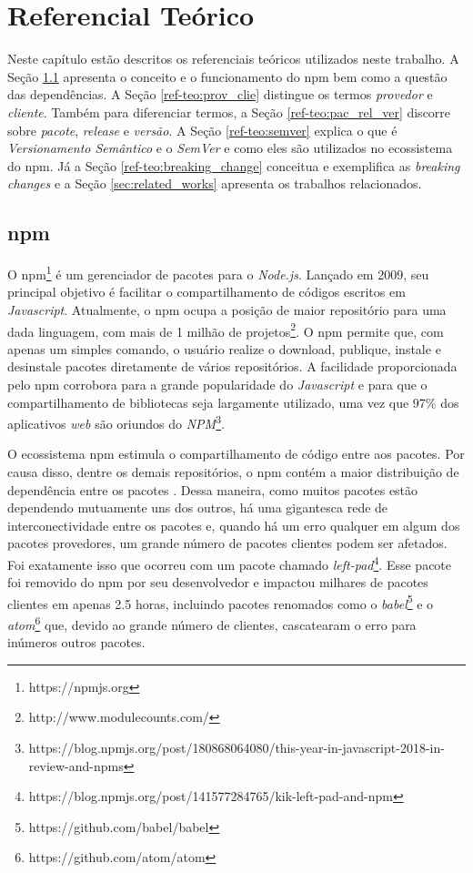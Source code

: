 \chapter{Referencial Teórico}
\label{cap:ref-teorico}
Neste capítulo estão descritos os referenciais teóricos utilizados neste trabalho. A Seção \ref{ref-teo:npm} apresenta o conceito e o funcionamento do \gls{npm} bem como a questão das dependências. A Seção \ref{ref-teo:prov_clie} distingue os termos \textit{provedor} e \textit{cliente}. Também para diferenciar termos, a Seção \ref{ref-teo:pac_rel_ver} discorre sobre \textit{pacote}, \textit{release} e \textit{versão}. A Seção \ref{ref-teo:semver} explica o que é \textit{Versionamento Semântico} e o \textit{SemVer} e como eles são utilizados no ecossistema do \gls{npm}. Já a Seção \ref{ref-teo:breaking_change} conceitua e exemplifica as \textit{breaking changes} e a Seção \ref{sec:related_works} apresenta os trabalhos relacionados.

\section{\gls{npm}}
\label{ref-teo:npm}
O \gls{npm}\footnote{https://npmjs.org} é um gerenciador de pacotes para o \textit{Node.js}. Lançado em 2009, seu principal objetivo é facilitar o compartilhamento de códigos escritos em \textit{Javascript}. Atualmente, o \gls{npm} ocupa a posição de maior repositório para uma dada linguagem, com mais de 1 milhão de projetos\footnote{http://www.modulecounts.com/}. O \gls{npm} permite que, com apenas um simples comando, o usuário realize o download, publique, instale e desinstale pacotes diretamente de vários repositórios. A facilidade proporcionada pelo \gls{npm} corrobora para a grande popularidade do \textit{Javascript} e para que o compartilhamento de bibliotecas seja largamente utilizado, uma vez que 97\% dos aplicativos \textit{web} são oriundos do \textit{NPM}\footnote{https://blog.npmjs.org/post/180868064080/this-year-in-javascript-2018-in-review-and-npms}.

O ecossistema \gls{npm} estimula o compartilhamento de código entre aos pacotes. Por causa disso, dentre os demais repositórios, o \gls{npm} contém a maior distribuição de dependência entre os pacotes \cite{teorical_reference:npm_2}. Dessa maneira, como muitos pacotes estão dependendo mutuamente uns dos outros, há uma gigantesca rede de interconectividade entre os pacotes e, quando há um erro qualquer em algum dos pacotes provedores, um grande número de pacotes clientes podem ser afetados. Foi exatamente isso que ocorreu com um pacote chamado \textit{left-pad}\footnote{https://blog.npmjs.org/post/141577284765/kik-left-pad-and-npm}. Esse pacote foi removido do \gls{npm} por seu desenvolvedor e impactou milhares de pacotes clientes em apenas 2.5 horas, incluindo pacotes renomados como o \textit{babel}\footnote{https://github.com/babel/babel} e o \textit{atom}\footnote{https://github.com/atom/atom} que, devido ao grande número de clientes, cascatearam o erro para inúmeros outros pacotes.

